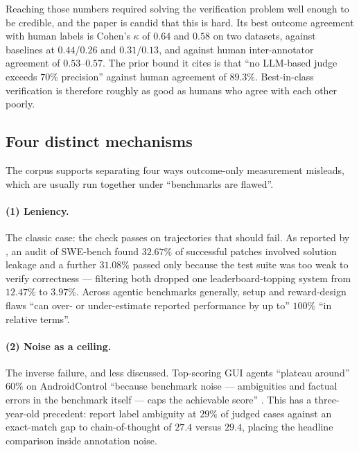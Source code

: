 \documentclass[10pt,twocolumn,a4paper]{article}
\begin{document}
Reaching those numbers required solving the verification problem well enough to be
credible, and the paper is candid that this is hard.
Its best outcome agreement with human labels is Cohen's $\kappa$ of $0.64$ and $0.58$ on
two datasets, against baselines at $0.44$/$0.26$ and $0.31$/$0.13$, and against human
inter-annotator agreement of $0.53$--$0.57$.
The prior bound it cites is that ``no LLM-based judge exceeds $70\%$ precision'' against
human agreement of $89.3\%$.
Best-in-class verification is therefore roughly as good as humans who agree with each
other poorly.

\subsection{Four distinct mechanisms}

The corpus supports separating four ways outcome-only measurement misleads, which are
usually run together under ``benchmarks are flawed''.

\paragraph{(1) Leniency.}
The classic case: the check passes on trajectories that should fail.
As reported by \citet{chen2026horizongapplanningmemory}, an audit of SWE-bench found
$32.67\%$ of successful patches involved solution leakage and a further $31.08\%$ passed only
because the test suite was too weak to verify correctness --- filtering both dropped one
leaderboard-topping system from $12.47\%$ to $3.97\%$.
Across agentic benchmarks generally, setup and reward-design flaws ``can over- or
under-estimate reported performance by up to'' $100\%$ ``in relative terms''.

\paragraph{(2) Noise as a ceiling.}
The inverse failure, and less discussed.
Top-scoring GUI agents ``plateau around'' $60\%$ on AndroidControl ``because benchmark
noise --- ambiguities and factual errors in the benchmark itself --- caps the achievable
score'' \citep{chen2026horizongapplanningmemory}.
This has a three-year-old precedent: \citet{yao2023reactsynergizingreasoningacting} report
label ambiguity at $29\%$ of judged cases against an exact-match gap to chain-of-thought of
$27.4$ versus $29.4$, placing the headline comparison inside annotation noise.
\end{document}
